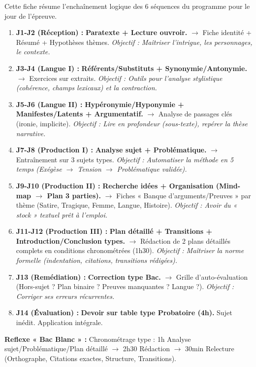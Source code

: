 \documentclass[11pt]{article}
\begin{document}
\begin{methode}
Cette fiche résume l'enchaînement logique des 6 séquences du programme pour le jour de l'épreuve.
\begin{enumerate}
    \item \textbf{J1-J2 (Réception) :} \textbf{Paratexte + Lecture ouvroir.} $\to$ Fiche identité + Résumé + Hypothèses thèmes. \textit{Objectif : Maîtriser l'intrigue, les personnages, le contexte.}
    \item \textbf{J3-J4 (Langue I) :} \textbf{Référents/Substituts + Synonymie/Antonymie.} $\to$ Exercices sur extraits. \textit{Objectif : Outils pour l'analyse stylistique (cohérence, champs lexicaux) et la contraction.}
    \item \textbf{J5-J6 (Langue II) :} \textbf{Hypéronymie/Hyponymie + Manifestes/Latents + Argumentatif.} $\to$ Analyse de passages clés (ironie, implicite). \textit{Objectif : Lire en profondeur (sous-texte), repérer la thèse narrative.}
    \item \textbf{J7-J8 (Production I) :} \textbf{Analyse sujet + Problématique.} $\to$ Entraînement sur 3 sujets types. \textit{Objectif : Automatiser la méthode en 5 temps (Exégèse $\to$ Tension $\to$ Problématique validée).}
    \item \textbf{J9-J10 (Production II) :} \textbf{Recherche idées + Organisation (Mind-map $\to$ Plan 3 parties).} $\to$ Fiches « Banque d'arguments/Preuves » par thème (Satire, Tragique, Femme, Langue, Histoire). \textit{Objectif : Avoir du « stock » textuel prêt à l'emploi.}
    \item \textbf{J11-J12 (Production III) :} \textbf{Plan détaillé + Transitions + Introduction/Conclusion types.} $\to$ Rédaction de 2 plans détaillés complets en conditions chronométrées (1h30). \textit{Objectif : Maîtriser la norme formelle (indentation, citations, transitions rédigées).}
    \item \textbf{J13 (Remédiation) :} \textbf{Correction type Bac.} $\to$ Grille d'auto-évaluation (Hors-sujet ? Plan binaire ? Preuves manquantes ? Langue ?). \textit{Objectif : Corriger ses erreurs récurrentes.}
    \item \textbf{J14 (Évaluation) :} \textbf{Devoir sur table type Probatoire (4h).} Sujet inédit. Application intégrale.
\end{enumerate}
\textbf{Reflexe « Bac Blanc » :} Chronométrage type : 1h Analyse sujet/Problématique/Plan détaillé $\to$ 2h30 Rédaction $\to$ 30min Relecture (Orthographe, Citations exactes, Structure, Transitions).
\end{methode}
\end{document}
